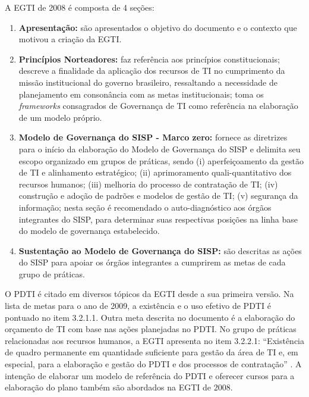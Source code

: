 A EGTI de 2008 é composta de 4 seções:
\begin{enumerate}
\item \textbf{Apresentação:} são apresentados o objetivo do documento e o contexto que motivou a criação da EGTI.
\item \textbf{Princípios Norteadores:} faz referência aos princípios constitucionais; descreve a finalidade da aplicação dos recursos de TI no cumprimento da missão institucional do governo brasileiro, ressaltando a necessidade de planejamento em consonância com as metas institucionais; toma os \textit{frameworks} consagrados de Governança de TI como referência na elaboração de um modelo próprio.
\item \textbf{Modelo de Governança do SISP - Marco zero:} fornece as diretrizes para o início da elaboração do Modelo de Governança do SISP e delimita seu escopo organizado em grupos de práticas, sendo (i) aperfeiçoamento da gestão de TI e alinhamento estratégico; (ii) aprimoramento quali-quantitativo dos recursos humanos; (iii) melhoria do processo de contratação de TI; (iv) construção e adoção de padrões e modelos de gestão de TI; (v) segurança da informação; nesta seção é recomendado o auto-diagnóstico aos órgãos integrantes do SISP, para determinar suas respectivas posições na linha base do modelo de governança estabelecido.
\item \textbf{Sustentação ao Modelo de Governança do SISP:} são descritas as ações do SISP para apoiar os órgãos integrantes a cumprirem as metas de cada grupo de práticas.
\end{enumerate}

O PDTI é citado em diversos tópicos da EGTI desde a sua primeira versão. Na lista de metas para o ano de 2009, a existência e o uso efetivo de PDTI é pontuado no item 3.2.1.1. Outra meta descrita no documento é a elaboração do orçamento de TI com base nas ações planejadas no PDTI. No grupo de práticas relacionadas aos recursos humanos, a EGTI apresenta no item 3.2.2.1: ``Existência de quadro permanente em quantidade suficiente para gestão da área de TI e, em especial, para a elaboração e gestão do PDTI e dos processos de contratação'' \cite[p. 4]{egti:08}. A intenção de elaborar um modelo de referência do PDTI e oferecer cursos para a elaboração do plano também são abordados na EGTI de 2008.

